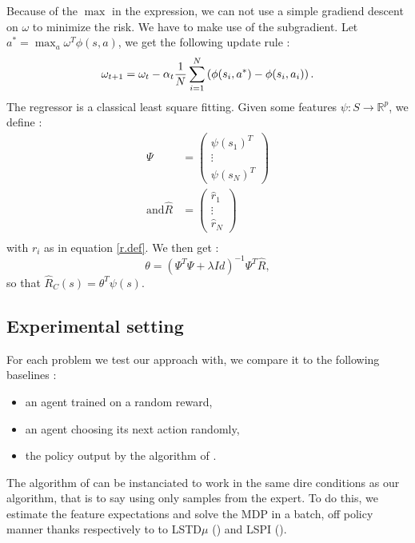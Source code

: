 \documentclass{llncs}
\newcommand{\0}{\mathbf{0}}
\newcommand{\1}{\mathbf{1}}
\begin{document}
Because of the $\max$ in the expression, we can not use a simple gradiend descent on $\omega$ to minimize the risk. We have to make use of the subgradient. Let $a^* = \max_a\omega^T\phi(s,a)$, we get the following update rule :
\begin{equation}
  \omega_{t+1} = \omega_t -\alpha_t{1\over N}\sum_{i=1}^N\left(\phi(s_i,a^*) - \phi(s_i,a_i)\right).
\end{equation}
The regressor is a classical least square fitting. Given some features $\psi : S\rightarrow \mathbb{R}^p$, we define :
\begin{eqnarray}
\Psi &= \begin{pmatrix}\psi(s_1)^T\\\vdots\\\psi(s_N)^T\end{pmatrix}\\
\textrm{and}
\hat R &= \begin{pmatrix}\hat r_1 \\\vdots\\\hat r_N\end{pmatrix}\\
\end{eqnarray}
with $r_i$ as in equation \ref{r.def}. We then get :
\begin{equation}
\theta = (\Psi^T\Psi + \lambda Id)^{-1}\Psi^T\hat R,
\end{equation}
so that $\hat R_C(s) = \theta^T \psi(s)$.\\
\subsection{Experimental setting}
For each problem we test our approach with, we compare it to the following baselines :
\begin{itemize}
\item an agent trained on a random reward,
\item an agent choosing its next action randomly,
\item the policy output by the algorithm of \cite{abbeel2004apprenticeship}.
\end{itemize}

The algorithm of \cite{abbeel2004apprenticeship} can be instanciated to work in the same dire conditions as our algorithm, that is to say using only samples from the expert. To do this, we estimate the feature expectations and solve the MDP in a batch, off policy manner thanks respectively to to LSTD$\mu$ (\cite{klein2011batch}) and LSPI (\cite{lagoudakis2003least}).\\
\end{document}
